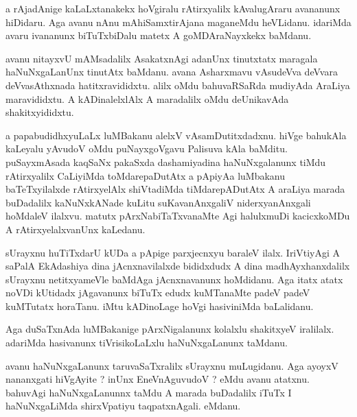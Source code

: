 \documentclass{article}
\begin{document}
\begin{mn}%
a rAjadAnige kaLaLxtanakekx hoVgiralu rAtirxyalilx kAvalugAraru avananunx hiDidaru. Aga avanu nAnu 
mAhiSamxtirAjana maganeMdu heVLidanu. idariMda avaru ivananunx biTuTxbiDalu matetx A 
goMDAraNayxkekx baMdanu.
\end{mn}

\begin{mn}%
avanu nitayxvU mAMsadalilx AsakatxnAgi adanUnx tinutxtatx maragala haNuNxgaLanUnx tinutAtx baMdanu. 
avana Asharxmavu vAsudeVva deVvara deVvasAthxnada hatitxravididxtu. alilx oMdu bahuvaRSaRda 
mudiyAda AraLiya maravididxtu. A kADinalelxlAlx A maradalilx oMdu deUnikavAda shakitxyididxtu.
\end{mn}

\begin{mn}%
a papabudidhxyuLaLx luMBakanu alelxV vAsamDutitxdadxnu. hiVge bahukAla kaLeyalu yAvudoV oMdu 
puNayxgoVgavu Palisuva kAla baMditu. puSayxmAsada kaqSaNx pakaSxda dashamiyadina haNuNxgalanunx 
tiMdu rAtirxyalilx CaLiyiMda toMdarepaDutAtx a pApiyAa luMbakanu baTeTxyilalxde rAtirxyelAlx 
shiVtadiMda tiMdarepADutAtx A araLiya marada buDadalilx kaNuNxkANade kuLitu  suKavanAnxgaliV 
niderxyanAnxgali hoMdaleV ilalxvu. matutx pArxNabiTaTxvanaMte Agi halulxmuDi kacicxkoMDu A 
rAtirxyelalxvanUnx kaLedanu.
\end{mn}

\begin{mn}%
sUrayxnu huTiTxdarU kUDa a pApige parxjecnxyu baraleV ilalx. IriVtiyAgi A saPalA EkAdashiya dina 
jAcnxnavilalxde bididxdudx A dina madhAyxhanxdalilx sUrayxnu netitxyameVle baMdAga jAcnxnavanunx 
hoMdidanu. Aga itatx atatx noVDi kUtidadx jAgavanunx biTuTx edudx kuMTanaMte padeV padeV kuMTutatx 
horaTanu. iMtu kADinoLage hoVgi hasiviniMda baLalidanu.
\end{mn}

\begin{mn}%
Aga duSaTxnAda luMBakanige pArxNigalanunx kolalxlu shakitxyeV iralilalx. adariMda hasivanunx 
tiVrisikoLaLxlu haNuNxgaLanunx taMdanu.
\end{mn}

\begin{mn}%
avanu haNuNxgaLanunx taruvaSaTxralilx sUrayxnu muLugidanu. Aga ayoyxV nananxgati hiVgAyite ? inUnx 
EneVnAguvudoV ? eMdu avanu atatxnu. bahuvAgi haNuNxgaLanunnx taMdu A marada buDadalilx iTuTx I 
haNuNxgaLiMda shirxVpatiyu taqpatxnAgali. eMdanu.
\end{mn}
\end{document}
